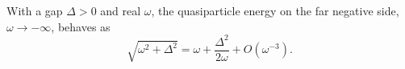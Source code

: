 \documentclass{article}
\begin{document}
With a gap $\Delta>0$ and real $\omega$, the quasiparticle energy on the far negative side, $\omega\to-\infty$, behaves as
\begin{equation}
\sqrt{\omega^2+\Delta^2} = \omega + \frac{\Delta^2}{2\omega} + O(\omega^{-3}) .
\label{eq:tail}
\end{equation}
\end{document}

